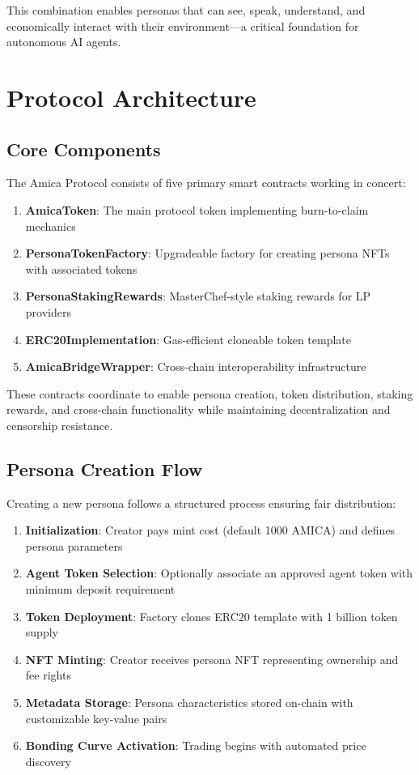 \documentclass{article}
\begin{document}
This combination enables personas that can see, speak, understand, and economically interact with their environment—a critical foundation for autonomous AI agents.

\section{Protocol Architecture}

\subsection{Core Components}

The Amica Protocol consists of five primary smart contracts working in concert:

\begin{enumerate}
    \item \textbf{AmicaToken}: The main protocol token implementing burn-to-claim mechanics
    \item \textbf{PersonaTokenFactory}: Upgradeable factory for creating persona NFTs with associated tokens
    \item \textbf{PersonaStakingRewards}: MasterChef-style staking rewards for LP providers
    \item \textbf{ERC20Implementation}: Gas-efficient cloneable token template
    \item \textbf{AmicaBridgeWrapper}: Cross-chain interoperability infrastructure
\end{enumerate}

These contracts coordinate to enable persona creation, token distribution, staking rewards, and cross-chain functionality while maintaining decentralization and censorship resistance.

\subsection{Persona Creation Flow}

Creating a new persona follows a structured process ensuring fair distribution:

\begin{enumerate}
    \item \textbf{Initialization}: Creator pays mint cost (default 1000 AMICA) and defines persona parameters
    \item \textbf{Agent Token Selection}: Optionally associate an approved agent token with minimum deposit requirement
    \item \textbf{Token Deployment}: Factory clones ERC20 template with 1 billion token supply
    \item \textbf{NFT Minting}: Creator receives persona NFT representing ownership and fee rights
    \item \textbf{Metadata Storage}: Persona characteristics stored on-chain with customizable key-value pairs
    \item \textbf{Bonding Curve Activation}: Trading begins with automated price discovery
\end{enumerate}
\end{document}
